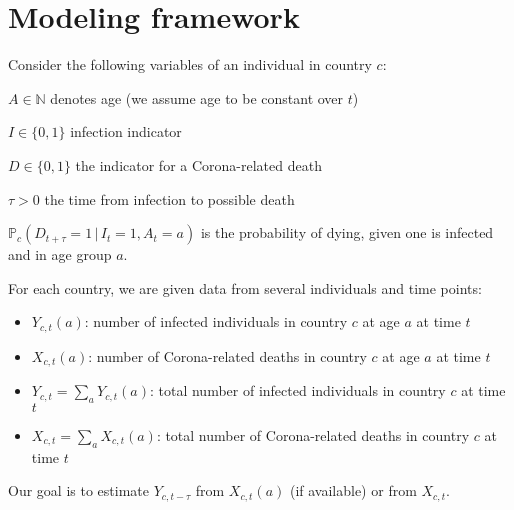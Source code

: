 \documentclass[a4paper]{article}
\newcommand\N{\mathbb{N}}
\renewcommand\P{\mathbb{P}}
\newcommand{\given}{\, \vert \,}
\begin{document}
\section{Modeling framework} \label{sec:model}
Consider the following variables of an individual in country $c$: 
\begin{compactitem}
\item $A \in \N$ denotes age (we assume age to be constant over $t$)
\item $I \in \{0,1\}$ infection indicator
\item $D \in \{0,1\}$ the indicator for a Corona-related death 
\item $\tau > 0$ the time from infection to possible death
\item $\P_c(D_{t+\tau} = 1 \given I_t = 1, A_t = a)$ is the probability of dying, given one is infected and in age group $a$.
\end{compactitem}



For each country, we are given data from several individuals and time points:

\begin{itemize}
\item $Y_{c,t}(a)$: number of infected individuals in country $c$ at age $a$ at time $t$
\item $X_{c,t}(a)$: number of Corona-related deaths in country $c$ at age $a$ at time $t$
\item $Y_{c,t} = \sum_a Y_{c,t}(a)$: total number of infected individuals in country $c$ at time $t$
\item $X_{c,t} = \sum_a X_{c,t}(a)$: total number of Corona-related deaths in country $c$ at time $t$
\end{itemize}
%
Our goal is to estimate $Y_{c,t-\tau}$ from $X_{c,t}(a)$ (if available) or from $X_{c,t}$. 
\end{document}
